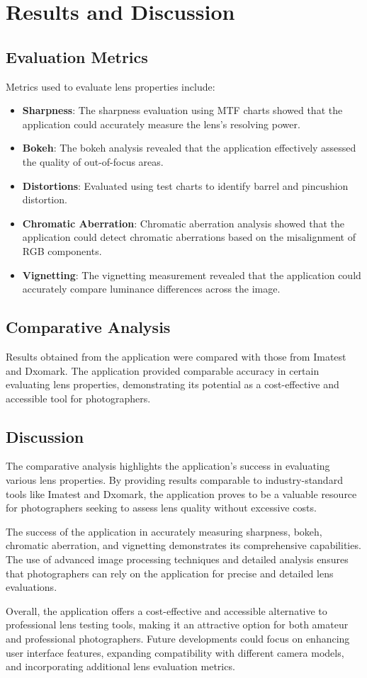 \chapter{Results and Discussion}
\section{Evaluation Metrics}
Metrics used to evaluate lens properties include:
\begin{itemize}
    \item \textbf{Sharpness}: The sharpness evaluation using MTF charts showed that the application could accurately measure the lens's resolving power.
    \item \textbf{Bokeh}: The bokeh analysis revealed that the application effectively assessed the quality of out-of-focus areas.
    \item \textbf{Distortions}: Evaluated using test charts to identify barrel and pincushion distortion.
    \item \textbf{Chromatic Aberration}: Chromatic aberration analysis showed that the application could detect chromatic aberrations based on the misalignment of RGB components.
    \item \textbf{Vignetting}: The vignetting measurement revealed that the application could accurately compare luminance differences across the image.
\end{itemize}

\section{Comparative Analysis}
Results obtained from the application were compared with those from Imatest and Dxomark. The application provided comparable accuracy in certain evaluating lens properties, demonstrating its potential as a cost-effective and accessible tool for photographers.

\section{Discussion}

The comparative analysis highlights the application's success in evaluating various lens properties. By providing results comparable to industry-standard tools like Imatest and Dxomark, the application proves to be a valuable resource for photographers seeking to assess lens quality without excessive costs.

The success of the application in accurately measuring sharpness, bokeh, chromatic aberration, and vignetting demonstrates its comprehensive capabilities. The use of advanced image processing techniques and detailed analysis ensures that photographers can rely on the application for precise and detailed lens evaluations.

Overall, the application offers a cost-effective and accessible alternative to professional lens testing tools, making it an attractive option for both amateur and professional photographers. Future developments could focus on enhancing user interface features, expanding compatibility with different camera models, and incorporating additional lens evaluation metrics.
